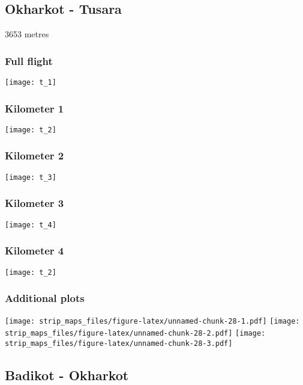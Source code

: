 \documentclass[]{article}
\begin{document}
\newpage

\subsection{Okharkot - Tusara}\label{okharkot---tusara}

3653 metres

\subsubsection{Full flight}\label{full-flight-19}

\texttt{[image: t\_1]}

\subsubsection{Kilometer 1}\label{kilometer-1-19}

\texttt{[image: t\_2]}

\subsubsection{Kilometer 2}\label{kilometer-2-19}

\texttt{[image: t\_3]}

\subsubsection{Kilometer 3}\label{kilometer-3-19}

\texttt{[image: t\_4]}

\subsubsection{Kilometer 4}\label{kilometer-4-18}

\texttt{[image: t\_2]}

\subsubsection{Additional plots}\label{additional-plots-19}

\texttt{[image: strip\_maps\_files/figure-latex/unnamed-chunk-28-1.pdf]}
\texttt{[image: strip\_maps\_files/figure-latex/unnamed-chunk-28-2.pdf]}
\texttt{[image: strip\_maps\_files/figure-latex/unnamed-chunk-28-3.pdf]}

\newpage

\subsection{Badikot - Okharkot}\label{badikot---okharkot}
\end{document}
